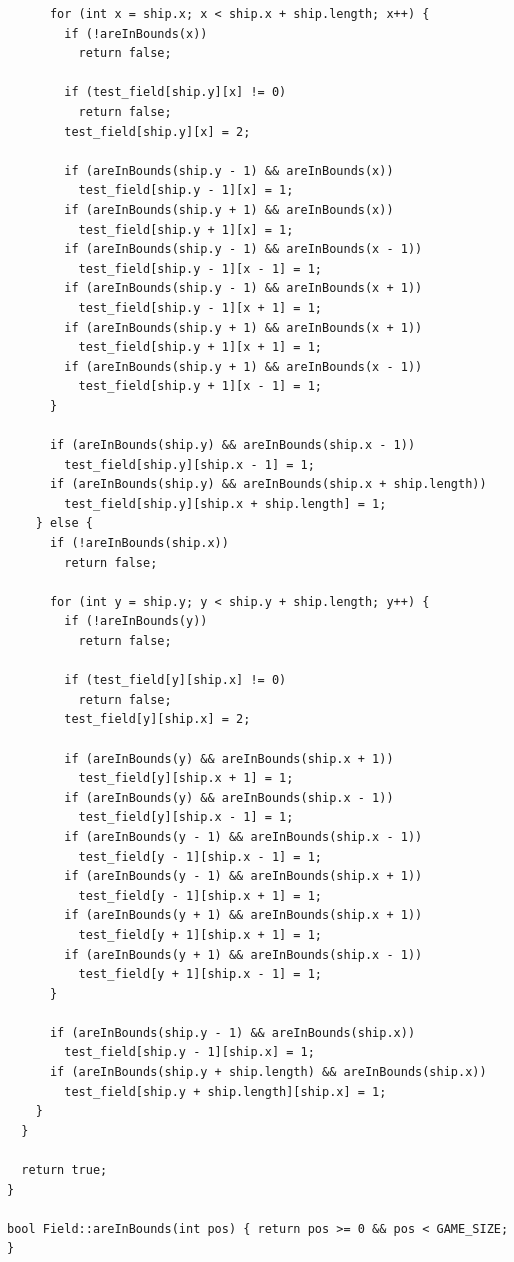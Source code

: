 \documentclass[a4paper,14pt]{extarticle}
\begin{document}
\begin{verbatim}
      for (int x = ship.x; x < ship.x + ship.length; x++) {
        if (!areInBounds(x))
          return false;

        if (test_field[ship.y][x] != 0)
          return false;
        test_field[ship.y][x] = 2;

        if (areInBounds(ship.y - 1) && areInBounds(x))
          test_field[ship.y - 1][x] = 1;
        if (areInBounds(ship.y + 1) && areInBounds(x))
          test_field[ship.y + 1][x] = 1;
        if (areInBounds(ship.y - 1) && areInBounds(x - 1))
          test_field[ship.y - 1][x - 1] = 1;
        if (areInBounds(ship.y - 1) && areInBounds(x + 1))
          test_field[ship.y - 1][x + 1] = 1;
        if (areInBounds(ship.y + 1) && areInBounds(x + 1))
          test_field[ship.y + 1][x + 1] = 1;
        if (areInBounds(ship.y + 1) && areInBounds(x - 1))
          test_field[ship.y + 1][x - 1] = 1;
      }

      if (areInBounds(ship.y) && areInBounds(ship.x - 1))
        test_field[ship.y][ship.x - 1] = 1;
      if (areInBounds(ship.y) && areInBounds(ship.x + ship.length))
        test_field[ship.y][ship.x + ship.length] = 1;
    } else {
      if (!areInBounds(ship.x))
        return false;

      for (int y = ship.y; y < ship.y + ship.length; y++) {
        if (!areInBounds(y))
          return false;

        if (test_field[y][ship.x] != 0)
          return false;
        test_field[y][ship.x] = 2;

        if (areInBounds(y) && areInBounds(ship.x + 1))
          test_field[y][ship.x + 1] = 1;
        if (areInBounds(y) && areInBounds(ship.x - 1))
          test_field[y][ship.x - 1] = 1;
        if (areInBounds(y - 1) && areInBounds(ship.x - 1))
          test_field[y - 1][ship.x - 1] = 1;
        if (areInBounds(y - 1) && areInBounds(ship.x + 1))
          test_field[y - 1][ship.x + 1] = 1;
        if (areInBounds(y + 1) && areInBounds(ship.x + 1))
          test_field[y + 1][ship.x + 1] = 1;
        if (areInBounds(y + 1) && areInBounds(ship.x - 1))
          test_field[y + 1][ship.x - 1] = 1;
      }

      if (areInBounds(ship.y - 1) && areInBounds(ship.x))
        test_field[ship.y - 1][ship.x] = 1;
      if (areInBounds(ship.y + ship.length) && areInBounds(ship.x))
        test_field[ship.y + ship.length][ship.x] = 1;
    }
  }

  return true;
}

bool Field::areInBounds(int pos) { return pos >= 0 && pos < GAME_SIZE; }
\end{verbatim}
\end{document}
